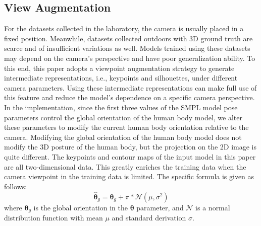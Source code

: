 \documentclass[journal]{IEEEtran}
\begin{document}
\subsection{View Augmentation}

For the datasets collected in the laboratory, the camera is usually placed in a fixed position. Meanwhile, datasets collected outdoors with 3D ground truth are scarce and of insufficient variations as well. Models trained using these datasets may depend on the camera's perspective and have poor generalization ability. To this end, this paper adopts a viewpoint augmentation strategy to generate intermediate representations, i.e., keypoints and silhouettes, under different camera parameters. Using these intermediate representations can make full use of this feature and reduce the model's dependence on a specific camera perspective. In the implementation, since the first three values of the SMPL model pose parameters control the global orientation of the human body model, we alter these parameters to modify the current human body orientation relative to the camera. Modifying the global orientation of the human body model does not modify the 3D posture of the human body, but the projection on the 2D image is quite different. The keypoints and contour maps of the input model in this paper are all two-dimensional data. This greatly enriches the training data when the camera viewpoint in the training data is limited. The specific formula is given as follows:
\begin{equation}
    \hat{\bm{\theta}}_{g} = \bm{\theta}_{g} + \pi*\mathcal{N}(\mu, \sigma^{2}) 
\end{equation}
where $\bm{\theta}_{g}$ is the global orientation in the $\bm{\theta}$ parameter, and $\mathcal{N}$ is  a normal distribution function with mean $\mu$ and standard derivation $\sigma$.
\end{document}
